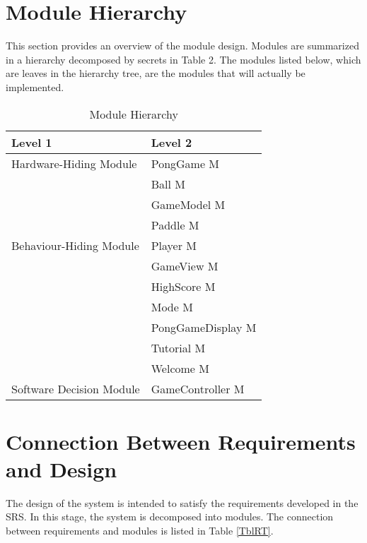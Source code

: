 \documentclass[12pt,letterpaper]{article}
\newcounter{mnum}
\newcommand{\mthemnum}{M\themnum}
\begin{document}
	\section{Module Hierarchy} \label{SecMH}
	This section provides an overview of the module design. Modules are summarized in a hierarchy decomposed by secrets in Table 2. The modules listed below, which are leaves in the hierarchy tree, are the modules that will actually be implemented.
\begin{table}[h!]
\centering
\begin{tabular}{p{} p{}}
\toprule
\textbf{Level 1} & \textbf{Level 2}\\
\midrule
{Hardware-Hiding Module} & PongGame {mnum} \mthemnum \label{mHH} \\ 
\midrule
\multirow{7}{0.3\textwidth}{Behaviour-Hiding Module} 
& Ball {mnum} \mthemnum \label{mBall} \\
& GameModel {mnum} \mthemnum \label{mGM}\\
& Paddle {mnum} \mthemnum \label{mPad}\\
& Player {mnum} \mthemnum \label{mPlayer}\\
& GameView {mnum} \mthemnum \label{mV}\\
& HighScore {mnum} \mthemnum \label{mScore}\\
& Mode {mnum} \mthemnum \label{mMode}\\
& PongGameDisplay {mnum} \mthemnum \label{mDisplay}\\
& Tutorial {mnum} \mthemnum \label{mTut}\\
& Welcome {mnum} \mthemnum \label{mWel}\\
\midrule
\multirow{2}{0.3\textwidth}{Software Decision Module} & GameController {mnum} \mthemnum \label{mCon}\\
\bottomrule
\end{tabular}
\caption{Module Hierarchy}
\label{TblMH}
\end{table}
	\section{Connection Between Requirements and Design} \label{SecConnection}
	The design of the system is intended to satisfy the requirements developed in the SRS. In this stage, the system is decomposed into modules. The connection between requirements and modules is listed in Table  \ref{TblRT}.
\end{document}
